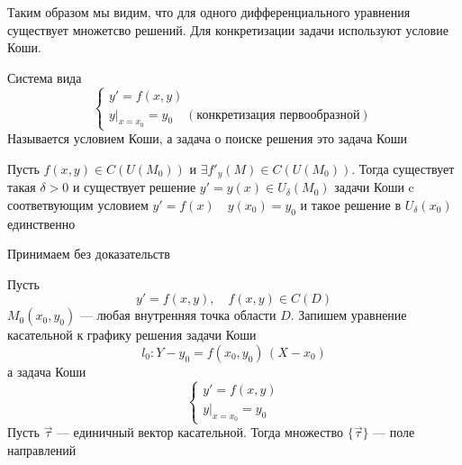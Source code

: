     Таким образом мы видим, что для одного дифференциального уравнения существует множетсво решений. Для конкретизации задачи используют условие Коши.

\begin{Def}
    Система вида
    \[
        \begin{cases}
            y' = f(x, y)\\
            y|_{x = x_0} = y_0 \quad (\text{конкретизация первообразной})
        \end{cases}
    \]
    Называется условием Коши, а задача о поиске решения это задача Коши
\end{Def}

    \begin{figure}[h!]
        \noindent{}
    \end{figure}

\begin{Th}
    Пусть $f(x, y) \in C(U(M_0))$ и $\exists f'_y(M) \in C(U(M_0))$. Тогда существует такая $\delta > 0$ и существует решение $y' = y(x) \in U_\delta(M_0)$ задачи Коши c соответвующим условием $y' = f(x) \quad y(x_0) = y_0$ и такое решение в $U_\delta(x_0)$ единственно
\end{Th}
\begin{Proof}
    Принимаем без доказательств
\end{Proof}

\begin{Def}
    Пусть 
    \[
        y' = f(x, y), \quad f(x, y) \in C(D)
    \]
    $M_0(x_0, y_0)$ --- любая внутренняя точка области $D$. Запишем уравнение касательной к графику решения задачи Коши
    \[
        l_0 : Y-y_0 = f(x_0, y_0)\,(X-x_0)
    \]
    а задача Коши
    \[
        \begin{cases}
            y' = f(x, y)\\
            y|_{x = x_0} = y_0
        \end{cases}
    \]
    Пусть $\vec{\tau}$ --- единичный вектор касательной. Тогда множество $\{\vec{\tau}\}$ --- поле направлений
\end{Def}

